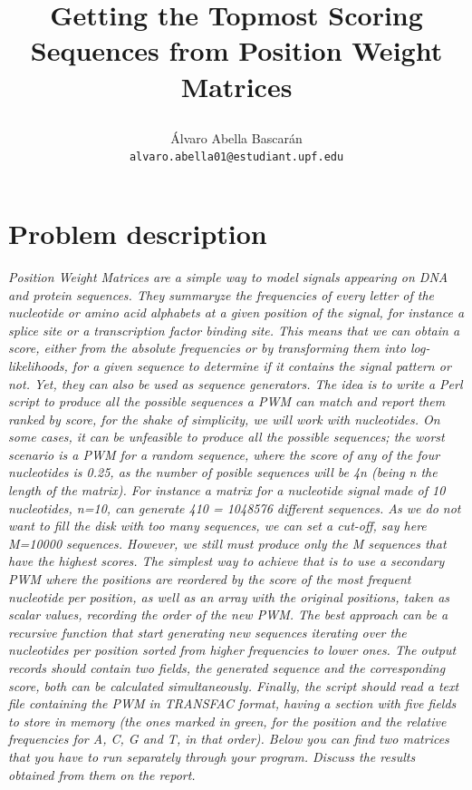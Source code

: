 \documentclass{article}
\begin{document}
\title{Getting the Topmost Scoring Sequences from Position Weight Matrices
     \author{\'{A}lvaro Abella Bascar\'{a}n\\
     \texttt{alvaro.abella01@estudiant.upf.edu}}
     }
\maketitle

\newpage

\section{Problem description} \label{problem}
\emph{
Position Weight Matrices are a simple way to model signals appearing on DNA and protein sequences. They summaryze the frequencies of every letter of the nucleotide or amino acid alphabets at a given position of the signal, for instance a splice site or a transcription factor binding site. This means that we can obtain a score, either from the absolute frequencies or by transforming them into log-likelihoods, for a given sequence to determine if it contains the signal pattern or not. Yet, they can also be used as sequence generators. The idea is to write a Perl script to produce all the possible sequences a PWM can match and report them ranked by score, for the shake of simplicity, we will work with nucleotides. On some cases, it can be unfeasible to produce all the possible sequences; the worst scenario is a PWM for a random sequence, where the score of any of the four nucleotides is 0.25, as the number of posible sequences will be 4n (being n the length of the matrix). For instance a matrix for a nucleotide signal made of 10 nucleotides, n=10, can generate 410 = 1048576 different sequences. As we do not want to fill the disk with too many sequences, we can set a cut-off, say here M=10000 sequences. However, we still must produce only the M sequences that have the highest scores. The simplest way to achieve that is to use a secondary PWM where the positions are reordered by the score of the most frequent nucleotide per position, as well as an array with the original positions, taken as scalar values, recording the order of the new PWM. The best approach can be a recursive function that start generating new sequences iterating over the nucleotides per position sorted from higher frequencies to lower ones. The output records should contain two fields, the generated sequence and the corresponding score, both can be calculated simultaneously. Finally, the script should read a text file containing the PWM in TRANSFAC format, having a section with five fields to store in memory (the ones marked in green, for the position and the relative frequencies for A, C, G and T, in that order). Below you can find two matrices that you have to run separately through your program. Discuss the results obtained from them on the report.
}
\end{document}
